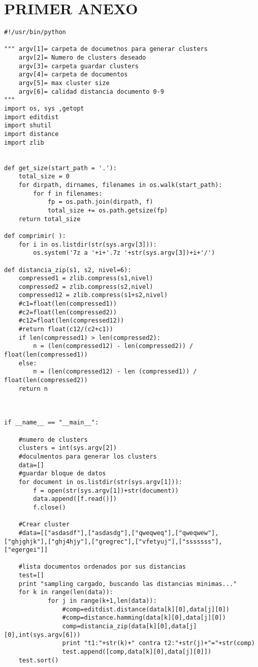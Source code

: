 

\chapter{PRIMER ANEXO}
\label{ch:Codigo Metodo de agrupación propuesto}

\begin{lstlisting}
#!/usr/bin/python

""" argv[1]= carpeta de documetnos para generar clusters
	argv[2]= Numero de clusters deseado
	argv[3]= carpeta guardar clusters
	argv[4]= carpeta de documentos
	argv[5]= max cluster size
	argv[6]= calidad distancia documento 0-9
"""
import os, sys ,getopt
import editdist
import shutil
import distance
import zlib


def get_size(start_path = '.'):
    total_size = 0
    for dirpath, dirnames, filenames in os.walk(start_path):
        for f in filenames:
            fp = os.path.join(dirpath, f)
            total_size += os.path.getsize(fp)
    return total_size

def comprimir( ):
	for i in os.listdir(str(sys.argv[3])):
		os.system('7z a '+i+'.7z '+str(sys.argv[3])+i+'/')
	
def distancia_zip(s1, s2, nivel=6):
	compressed1 = zlib.compress(s1,nivel)
	compressed2 = zlib.compress(s2,nivel)
	compressed12 = zlib.compress(s1+s2,nivel)
	#c1=float(len(compressed1))
	#c2=float(len(compressed2))
	#c12=float(len(compressed12))
	#return float(c12/(c2+c1))
	if len(compressed1) > len(compressed2):
		n = (len(compressed12) - len(compressed2)) / float(len(compressed1))
	else:
		n = (len(compressed12) - len (compressed1)) / float(len(compressed2))	
	return n

		
    
if __name__ == "__main__":
	
	#numero de clusters
	clusters = int(sys.argv[2])
	#doculmentos para generar los clusters
	data=[]  
	#guardar bloque de datos 
	for document in os.listdir(str(sys.argv[1])):
		f = open(str(sys.argv[1])+str(document))
		data.append([f.read()])
		f.close()

	#Crear cluster
	#data=[["asdasdf"],["asdasdg"],["qweqweq"],["qweqwew"],["ghjghjk"],["ghj4hjy"],["gregrec"],["vfetyuj"],["sssssss"],["egergei"]]

	#lista documentos ordenados por sus distancias 
	test=[]
	print "sampling cargado, buscando las distancias minimas..."
	for k in range(len(data)):
			for j in range(k+1,len(data)):
				#comp=editdist.distance(data[k][0],data[j][0])
				#comp=distance.hamming(data[k][0],data[j][0])
				comp=distancia_zip(data[k][0],data[j][0],int(sys.argv[6]))
				print "t1:"+str(k)+" contra t2:"+str(j)+"="+str(comp)
				test.append([comp,data[k][0],data[j][0]])          
	test.sort()
	

\end{lstlisting}
